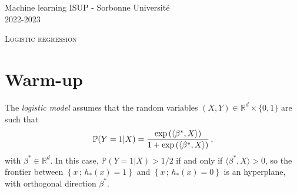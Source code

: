 \documentclass[a4paper,10pt,fleqn]{article}
\newcommand{\eqsp}{\,}
\newcommand{\rset}{\ensuremath{\mathbb{R}}}
\newcommand{\bP}{\mathbb{P}}
\newcommand{\1}{\ensuremath{\mathbbm{1}}}
\begin{document}
\noindent Machine learning \hfill ISUP - Sorbonne Universit\'e \\
 2022-2023

\noindent\hrulefill

\begin{center}
\textsc{Logistic regression}
\end{center}
\hrulefill

\medskip



\section{Warm-up}
The \emph{logistic model} assumes that the random variables  $(X,Y)\in \rset^d\times\{0,1\}$ are such that
$$
\bP(Y=1|X)={\exp\left(\langle \beta^*,X\rangle\right)\over 1+\exp\left(\langle \beta^*,X\rangle\right)}\eqsp,
$$
with $\beta^*\in\mathbb{R}^d$. In this case,  $\bP(Y=1|X)>1/2$ if and only if $\langle \beta^*,X\rangle>0$, so
the frontier between $\left\{x\eqsp;\eqsp h_{*}(x)=1\right\}$ and $\left\{x\eqsp ;\eqsp h_{*}(x)=0\right\}$ is an hyperplane, with orthogonal
direction $\beta^*$. 
\end{document}
